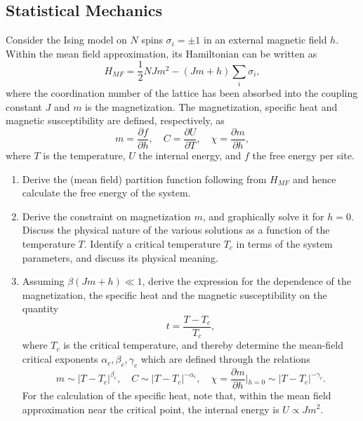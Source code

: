 \subsection{Statistical Mechanics}

\begin{exercise}
\label{physics:2024:4}
Consider the Ising model on $N$ spins $\sigma_i = \pm 1$ in an external magnetic field $h$. Within the mean field approximation, its Hamiltonian can be written as
\begin{equation}
    H_{MF} = \frac{1}{2} N J m^2 - (J m + h) \sum_i \sigma_i, \label{eq:2024:4:6}
\end{equation}
where the coordination number of the lattice has been absorbed into the coupling constant $J$ and $m$ is the magnetization. The magnetization, specific heat and magnetic susceptibility are defined, respectively, as
\begin{equation}
    m = \frac{\partial f}{\partial h}, \quad C = \frac{\partial U}{\partial T}, \quad \chi = \frac{\partial m}{\partial h}, \label{eq:2024:4:7}
\end{equation}
where $T$ is the temperature, $U$ the internal energy, and $f$ the free energy per site.

\begin{enumerate}[label=(\alph*)]
    \item Derive the (mean field) partition function following from $H_{MF} $ and hence calculate the free energy of the system.
    \item Derive the constraint on magnetization $m$, and graphically solve it for $h=0$. Discuss the physical nature of the various solutions as a function of the temperature $T$. Identify a critical temperature $T_c$ in terms of the system parameters, and discuss its physical meaning.
    \item Assuming $\beta (Jm + h) \ll 1$, derive the expression for the dependence of the magnetization, the specific heat and the magnetic susceptibility on the quantity
    \begin{equation}
        t = \frac{T - T_c}{T_c}, \label{eq:2024:4:8}
    \end{equation}
    where $T_c$ is the critical temperature, and thereby determine the mean-field critical exponents $\alpha_c, \beta_c, \gamma_c$ which are defined through the relations
    \begin{equation}
        m \sim | T - T_c |^{\beta_c}, \quad C \sim | T - T_c |^{-\alpha_c}, \quad \chi = \frac{\partial m}{\partial h}|_{h=0} \sim | T - T_c |^{-\gamma_c}. \label{eq:2024:4:9}
    \end{equation}
    For the calculation of the specific heat, note that, within the mean field approximation near the critical point, the internal energy is $U \propto Jm^2$.
\end{enumerate}
\end{exercise}

